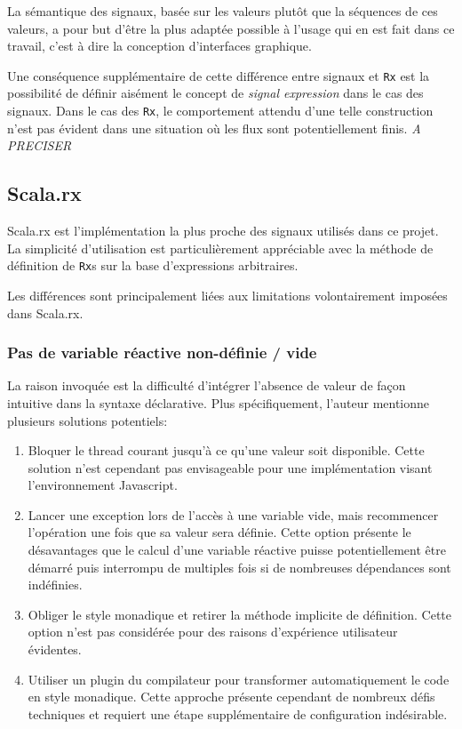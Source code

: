 La sémantique des signaux, basée sur les valeurs plutôt que la séquences de ces valeurs, a pour but d'être la plus adaptée possible à l'usage qui en est fait dans ce travail, c'est à dire la conception d'interfaces graphique.

Une conséquence supplémentaire de cette différence entre signaux et \texttt{Rx} est la possibilité de définir aisément le concept de \emph{signal expression} dans le cas des signaux. Dans le cas des \texttt{Rx}, le comportement attendu d'une telle construction n'est pas évident dans une situation où les flux sont potentiellement finis. \textit{A PRECISER}

\subsection{Scala.rx}

Scala.rx est l'implémentation la plus proche des signaux utilisés dans ce projet. La simplicité d'utilisation est particulièrement appréciable avec la méthode de définition de \texttt{Rx}s sur la base d'expressions arbitraires.

Les différences sont principalement liées aux limitations volontairement imposées dans Scala.rx.

\subsubsection{Pas de variable réactive non-définie / vide}

La raison invoquée est la difficulté d'intégrer l'absence de valeur de façon intuitive dans la syntaxe déclarative. Plus spécifiquement, l'auteur mentionne plusieurs solutions potentiels:
\begin{enumerate}
	\item Bloquer le thread courant jusqu'à ce qu'une valeur soit disponible. Cette solution n'est cependant pas envisageable pour une implémentation visant l'environnement Javascript.
	\item Lancer une exception lors de l'accès à une variable vide, mais recommencer l'opération une fois que sa valeur sera définie. Cette option présente le désavantages que le calcul d'une variable réactive puisse potentiellement être démarré puis interrompu de multiples fois si de nombreuses dépendances sont indéfinies.
	\item Obliger le style monadique et retirer la méthode implicite de définition. Cette option n'est pas considérée pour des raisons d'expérience utilisateur évidentes.
	\item Utiliser un plugin du compilateur pour transformer automatiquement le code en style monadique. Cette approche présente cependant de nombreux défis techniques et requiert une étape supplémentaire de configuration indésirable.
\end{enumerate}

